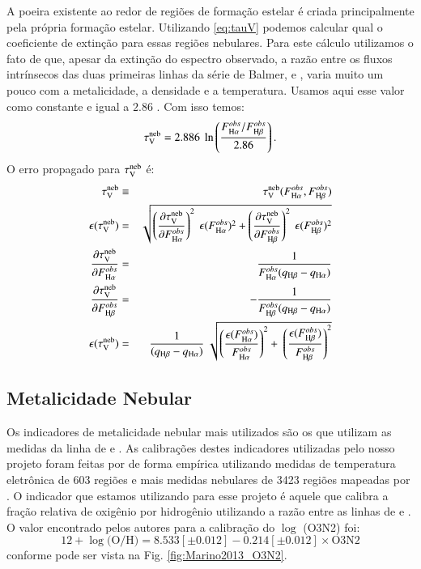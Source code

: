 A poeira existente ao redor de regiões de formação estelar é criada principalmente pela própria
formação estelar. Utilizando \eqref{eq:tauV} podemos calcular qual o coeficiente de extinção para
essas regiões nebulares. Para este cálculo utilizamos o fato de que, apesar da extinção do espectro
observado, a razão entre os fluxos intrínsecos das duas primeiras linhas da série de Balmer, \Halpha
e \Hbeta, varia muito um pouco com a metalicidade, a densidade e a temperatura. Usamos aqui esse
valor como constante e igual a $2.86$ \citep{Osterbrock.Ferland.2006a}. Com isso temos:
\begin{equation}
	\tauVN = 2.886\ \ln \left( \frac{F_{\Halpha}^{obs}/F_{\Hbeta}^{obs}}{2.86} \right).
\end{equation}
O erro propagado para $\tau_{\mathrm{V}}^{\mathrm{neb}}$ é:
\begin{eqnarray}
	\tauVN &\equiv& \tauVN(F_{\Halpha}^{obs}, F_{\Hbeta}^{obs}) \\
	\epsilon (\tauVN) &=& \sqrt{\left(\del{\tauVN}{F_{\Halpha}^{obs}}\right)^2 \
\epsilon (F_{\Halpha}^{obs})^2 + \left(\del{\tauVN}{F_{\Hbeta}^{obs}}\right)^2 \
\epsilon (F_{\Hbeta}^{obs})^2 } \\
	\del{\tauVN}{F_{\Halpha}^{obs}} &=& \frac{1}{F_{\Halpha}^{obs} (q_{\Hbeta} - q_{\Halpha})} \\
	\del{\tauVN}{F_{\Hbeta}^{obs}} &=& - \frac{1}{F_{\Hbeta}^{obs} (q_{\Hbeta} - q_{\Halpha})} \\
	\epsilon (\tauVN) &=& \frac{1}{(q_{\Hbeta} - q_{\Halpha})} \
\sqrt{\left(\frac{\epsilon (F_{\Halpha}^{obs})}{F_{\Halpha}^{obs}}\right)^2 + \
\left(\frac{\epsilon (F_{\Hbeta}^{obs})}{F_{\Hbeta}^{obs}}\right)^2 }
\end{eqnarray}

\subsection{Metalicidade Nebular}
\label{sec:emline:datacube:Zneb}

Os indicadores de metalicidade nebular mais utilizados são os que utilizam as medidas da linha de
\OIII e \NII. As calibrações destes indicadores utilizadas pelo nosso projeto foram feitas por
\citet{Marino.etal.2013a} de forma empírica utilizando medidas de temperatura eletrônica de 603
regiões \Hii e mais medidas nebulares de 3423 regiões \Hii mapeadas por \citet{Sanchez.etal.2013a}.
O indicador que estamos utilizando para esse projeto é aquele que calibra a fração relativa de
oxigênio por hidrogênio utilizando a razão entre as linhas de \oIII e \nII. O valor encontrado pelos
autores para a calibração do $\log$ (O3N2) foi:
\begin{equation}
	12 + \log \textrm{(O/H)} = 8.533[\pm0.012] - 0.214[\pm0.012]\times \textrm{O3N2}
\end{equation}
\noindent conforme pode ser vista na Fig. \ref{fig:Marino2013_O3N2}.

